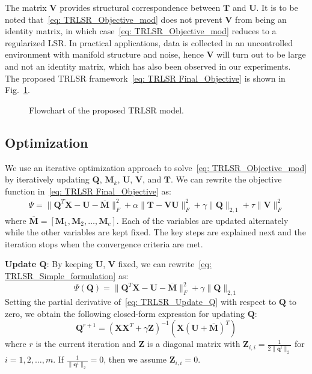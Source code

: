 %
The matrix $\bm{V}$ provides structural correspondence between $\bm{T}$ and $\bm{U}$. It is to be noted that~\eqref{eq: TRLSR_Objective_mod} does not prevent $\bm{V}$ from being an identity matrix, in which case~\eqref{eq: TRLSR_Objective_mod} reduces to a regularized LSR. In practical applications, data is collected in an uncontrolled environment with manifold structure and noise, hence $\bm{V}$ will turn out to be large and not an identity matrix, which has also been observed in our experiments. The proposed TRLSR framework~\eqref{eq: TRLSR Final_Objective} is shown in Fig.~\ref{Fig: TRLSR Flow chart}. 
%
\begin{figure}
\centering
\scalebox{.9}{}
\caption{Flowchart of the proposed TRLSR model.}
\label{Fig: TRLSR Flow chart}
\end{figure}
%
\subsection{Optimization}
%
We use an iterative optimization approach to solve~\eqref{eq: TRLSR_Objective_mod} by iteratively updating $\bm{Q}$, $\bm{M}_{k}$, $\bm{U}$, $\bm{V}$, and $\bm{T}$. We can rewrite the objective function in~\eqref{eq: TRLSR Final_Objective} as:
%
\begin{align}
    \label{eq: TRLSR_Simple_formulation}
     \Psi = \|\bm{Q}^{T}\bm{X} - \bm{U} - \overline{\bm{M}} \|_{F}^{2} + \alpha \| \bm{T} - \bm{V} \bm{U}\|_{F}^{2} + \gamma \| \bm{Q}\|_{2,1}   + \tau \| \bm{V} \|_{F}^{2} 
\end{align}
%
where $\overline{\bm{M}} = \left[\bm{M}_{1}, \bm{M}_{2},\dots,\bm{M}_{c}\right]$. Each of the variables are updated alternately while the other variables are kept fixed. The key steps are explained next and the iteration stops when the convergence criteria are met.
 
\noindent\textbf{Update $\bm{Q}$}: By keeping $\bm{U}$, $\bm{V}$ fixed, we can rewrite~\eqref{eq: TRLSR_Simple_formulation} as:
\begin{equation}
    \label{eq: TRLSR_Update_Q}
    \Psi(\bm{Q})  = \| \bm{Q}^{T}\bm{X} - \bm{U} - \overline{\bm{M}}\|_{F}^{2} + \gamma\|\bm{Q}\|_{2,1}
\end{equation}
%
Setting the partial derivative of~\eqref{eq: TRLSR_Update_Q} with respect to $\bm{Q}$ to zero, we obtain the following closed-form expression for updating $\bm{Q}$:
%
\begin{equation}
    \label{eq: TRLSR_Define_Q}
    \bm{Q}^{r+1} = \left(\bm{X}\bm{X}^{T} + \gamma \bm{Z}\right)^{-1} \left(\bm{X} \left(\bm{U} + \overline{\bm{M}}\right)^{T} \right)
\end{equation}
%
where $r$ is the current iteration and $\bm{Z}$ is a diagonal matrix with $\bm{Z}_{i,i}=\frac{1}{2\|\bm{q}^{i}\|_{2}}$ for $i= 1,2,\dots,m$. If $\frac{1}{\| \bm{q}^{i}\|_{2}}=0$, then we assume $\bm{Z}_{i,i}=0$.

